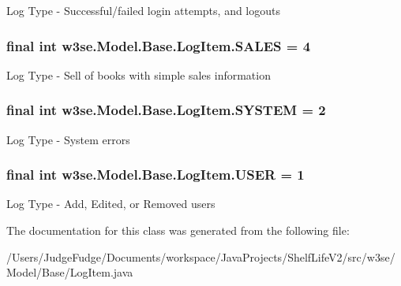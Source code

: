 Log Type -\/ Successful/failed login attempts, and logouts \hypertarget{classw3se_1_1_model_1_1_base_1_1_log_item_a5c236a773e159a0a005c086bae64919e}{
\subsubsection[{S\-A\-L\-E\-S}]{\setlength{\rightskip}{0pt plus 5cm}final int w3se.\-Model.\-Base.\-Log\-Item.\-S\-A\-L\-E\-S = 4\hspace{0.3cm}{\ttfamily [static]}}}\label{classw3se_1_1_model_1_1_base_1_1_log_item_a5c236a773e159a0a005c086bae64919e}
Log Type -\/ Sell of books with simple sales information \hypertarget{classw3se_1_1_model_1_1_base_1_1_log_item_aabdb055d1856ee1696926765c491280e}{
\subsubsection[{S\-Y\-S\-T\-E\-M}]{\setlength{\rightskip}{0pt plus 5cm}final int w3se.\-Model.\-Base.\-Log\-Item.\-S\-Y\-S\-T\-E\-M = 2\hspace{0.3cm}{\ttfamily [static]}}}\label{classw3se_1_1_model_1_1_base_1_1_log_item_aabdb055d1856ee1696926765c491280e}
Log Type -\/ System errors \hypertarget{classw3se_1_1_model_1_1_base_1_1_log_item_a0c7fc0675948fe7a6c775947e3a787b7}{
\subsubsection[{U\-S\-E\-R}]{\setlength{\rightskip}{0pt plus 5cm}final int w3se.\-Model.\-Base.\-Log\-Item.\-U\-S\-E\-R = 1\hspace{0.3cm}{\ttfamily [static]}}}\label{classw3se_1_1_model_1_1_base_1_1_log_item_a0c7fc0675948fe7a6c775947e3a787b7}
Log Type -\/ Add, Edited, or Removed users 

The documentation for this class was generated from the following file\-:\begin{DoxyCompactItemize}
\item 
/\-Users/\-Judge\-Fudge/\-Documents/workspace/\-Java\-Projects/\-Shelf\-Life\-V2/src/w3se/\-Model/\-Base/Log\-Item.\-java\end{DoxyCompactItemize}
